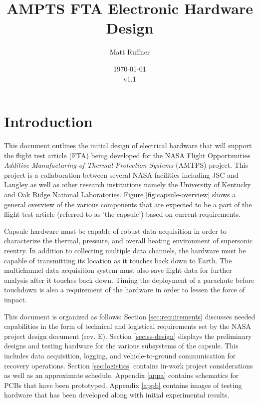 \documentclass{article}
\title{AMPTS FTA Electronic Hardware Design}
\author{Matt Ruffner}
\date{\today\\v1.1}
\newcommand{\ddrev}{E}
\begin{document}
\maketitle
\begin{center}
\end{center}
\tableofcontents \newpage
\listoffigures 
\listoftables \newpage



\section{Introduction}
This document outlines the initial design of electrical hardware that will support the flight test article (FTA) being developed for the NASA Flight Opportunities \textit{Additive Manufacturing of Thermal Protection Systems} (AMTPS) project. This project is a collaboration between several NASA facilities including JSC and Langley as well as other research institutions namely the University of Kentucky and Oak Ridge National Laboratories. Figure \ref{fig:capsule-overview} shows a general overview of the various components that are  expected to be a part of the flight test article (referred to as 'the capsule') based on current requirements.

Capsule hardware must be capable of robust data acquisition in order to characterize the thermal, pressure, and overall heating environment of supersonic reentry. In addition to collecting multiple data channels, the hardware must be capable of transmitting its location as it touches back down to Earth. The multichannel data acquisition system must also save flight data for further analysis after it touches back down. Timing the deployment of a parachute before touchdown is also a requirement of the hardware in order to lessen the force of impact.

This document is organized as follows: Section \ref{sec:requirements} discusses needed capabilities in the form of technical and logistical requirements set by the NASA project design document (rev. \ddrev ). Section \ref{sec:ss-design} displays the preliminary designs and testing hardware for the various subsystems of the capsule. This includes data acquisition, logging, and vehicle-to-ground communication for recovery operations. Section \ref{sec:logistics} contains in-work project considerations as well as an approximate schedule. Appendix \ref{appa} contains schematics for PCBs that have been prototyped. Appendix \ref{appb} contains images of testing hardware that has been developed along with initial experimental results. 
\end{document}
